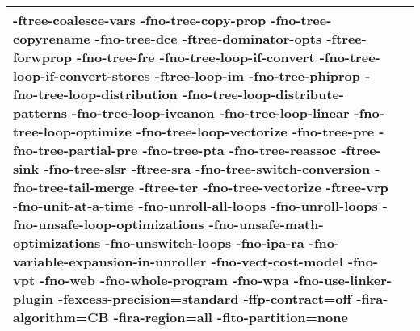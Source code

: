 \begin{tabular}{|l|p{6.2in}|}
\textbf{-ftree-coalesce-vars} -fno-tree-copy-prop -fno-tree-copyrename -fno-tree-dce \textbf{-ftree-dominator-opts} \textbf{-ftree-forwprop} -fno-tree-fre -fno-tree-loop-if-convert -fno-tree-loop-if-convert-stores \textbf{-ftree-loop-im} -fno-tree-phiprop -fno-tree-loop-distribution -fno-tree-loop-distribute-patterns -fno-tree-loop-ivcanon -fno-tree-loop-linear -fno-tree-loop-optimize -fno-tree-loop-vectorize -fno-tree-pre -fno-tree-partial-pre -fno-tree-pta -fno-tree-reassoc \textbf{-ftree-sink} -fno-tree-slsr \textbf{-ftree-sra} -fno-tree-switch-conversion -fno-tree-tail-merge \textbf{-ftree-ter} -fno-tree-vectorize \textbf{-ftree-vrp} -fno-unit-at-a-time -fno-unroll-all-loops -fno-unroll-loops -fno-unsafe-loop-optimizations -fno-unsafe-math-optimizations -fno-unswitch-loops -fno-ipa-ra -fno-variable-expansion-in-unroller -fno-vect-cost-model -fno-vpt -fno-web -fno-whole-program -fno-wpa -fno-use-linker-plugin \textbf{-fexcess-precision=standard} \textbf{-ffp-contract=off} \textbf{-fira-algorithm=CB} \textbf{-fira-region=all} \textbf{-flto-partition=none} }\\
     \hline
    \end{tabular}    